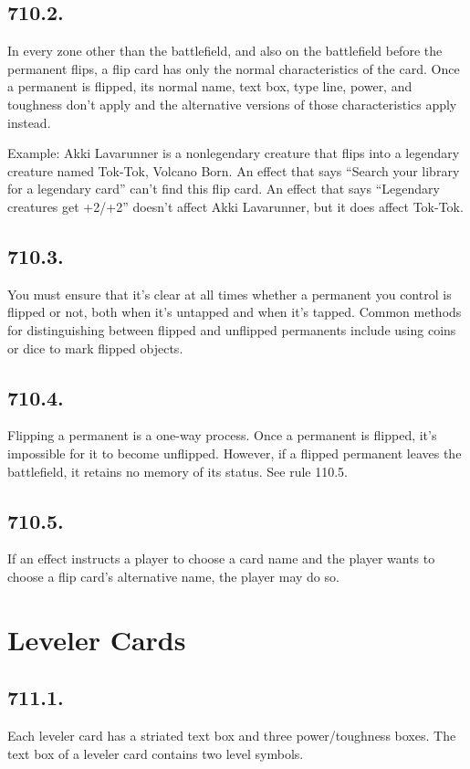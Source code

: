\subsection*{710.2.}
In every zone other than the battlefield, and also on the battlefield before the permanent flips, a flip card has only the normal characteristics of the card. Once a permanent is flipped, its normal name, text box, type line, power, and toughness don’t apply and the alternative versions of those characteristics apply instead.

Example: Akki Lavarunner is a nonlegendary creature that flips into a legendary creature named Tok-Tok, Volcano Born. An effect that says “Search your library for a legendary card” can’t find this flip card. An effect that says “Legendary creatures get +2/+2” doesn’t affect Akki Lavarunner, but it does affect Tok-Tok.

\subsection*{710.3.}
You must ensure that it’s clear at all times whether a permanent you control is flipped or not, both when it’s untapped and when it’s tapped. Common methods for distinguishing between flipped and unflipped permanents include using coins or dice to mark flipped objects.

\subsection*{710.4.}
Flipping a permanent is a one-way process. Once a permanent is flipped, it’s impossible for it to become unflipped. However, if a flipped permanent leaves the battlefield, it retains no memory of its status. See rule 110.5.

\subsection*{710.5.}
If an effect instructs a player to choose a card name and the player wants to choose a flip card’s alternative name, the player may do so.

\section{Leveler Cards}
\subsection*{711.1.}
Each leveler card has a striated text box and three power/toughness boxes. The text box of a leveler card contains two level symbols.

